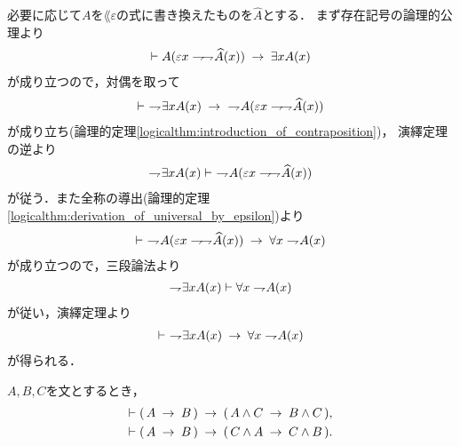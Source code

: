 	\begin{sketch}
		必要に応じて$A$を$\lang{\varepsilon}$の式に書き換えたものを$\widehat{A}$とする．
		まず存在記号の論理的公理より
		\begin{align}
			\vdash A(\varepsilon x \negation \negation \widehat{A}(x))
			\rarrow \exists x A(x)
		\end{align}
		が成り立つので，対偶を取って
		\begin{align}
			\vdash\ \negation \exists x A(x) 
			\rarrow\ \negation A(\varepsilon x \negation \negation \widehat{A}(x))
		\end{align}
		が成り立ち(論理的定理\ref{logicalthm:introduction_of_contraposition})，
		演繹定理の逆より
		\begin{align}
			\negation \exists x A(x) \vdash\ \negation A(\varepsilon x \negation \negation \widehat{A}(x))
		\end{align}
		が従う．また全称の導出(論理的定理\ref{logicalthm:derivation_of_universal_by_epsilon})より
		\begin{align}
			\vdash\ \negation A(\varepsilon x \negation \negation \widehat{A}(x))
			\rarrow \forall x \negation A(x)
		\end{align}
		が成り立つので，三段論法より
		\begin{align}
			\negation \exists x A(x) \vdash \forall x \negation A(x)
		\end{align}
		が従い，演繹定理より
		\begin{align}
			\vdash\ \negation \exists x A(x) \rarrow \forall x \negation A(x)
		\end{align}
		が得られる．
		\QED
	\end{sketch}
	
	\begin{screen}
		\begin{logicalthm}[含意の論理積への遺伝性]
		\label{logicalthm:heredity_of_implication_to_conjunction}
			$A,B,C$を文とするとき，
			\begin{align}
				\vdash (\, A \rarrow B\, ) \rarrow (\, A \wedge C 
				\rarrow B \wedge C\, ), \\
				\vdash (\, A \rarrow B\, ) \rarrow (\, C \wedge A 
				\rarrow C \wedge B\, ).
			\end{align}
		\end{logicalthm}
	\end{screen}
	
